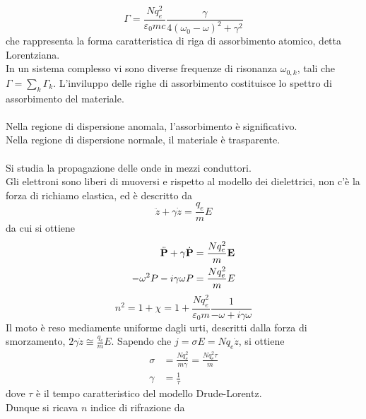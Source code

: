 \documentclass{article}
\begin{document}
\begin{equation}
    \Gamma=\frac{Nq_e^2}{\varepsilon_0mc}\frac{\gamma}{4(\omega_0-\omega)^2+\gamma^2}
    \nonumber
\end{equation}
che rappresenta la forma caratteristica di riga di assorbimento atomico, detta Lorentziana.\\
In un sistema complesso vi sono diverse frequenze di risonanza $\omega_{0,k}$, tali che $\Gamma=\sum_k\Gamma_k$. L’inviluppo delle righe di assorbimento costituisce lo spettro di assorbimento del materiale.\\
\\
Nella regione di dispersione anomala, l’assorbimento è significativo.\\
Nella regione di dispersione normale, il materiale è trasparente.\\
\\
Si studia la propagazione delle onde in mezzi conduttori.\\
Gli elettroni sono liberi di muoversi e rispetto al modello dei dielettrici, non c’è la forza di richiamo elastica, ed è descritto da
\begin{equation}
    \ddot{z}+\gamma\dot{z}=\frac{q_e}{m}E
    \nonumber
\end{equation}
da cui si ottiene
\begin{equation}
\begin{split}
    \Ddot{\textbf{P}}+\gamma\Dot{\textbf{P}}&=\frac{Nq_e^2}{m}\textbf{E}\\
    -\omega^2P-i\gamma\omega P&=\frac{Nq_e^2}{m}E
    \nonumber
\end{split}   
\end{equation}
\begin{equation}
    n^2=1+\chi=1+\frac{Nq_e^2}{\varepsilon_0m}\frac{1}{-\omega+i\gamma\omega}
    \nonumber
\end{equation}
Il moto è reso mediamente uniforme dagli urti, descritti dalla forza di smorzamento, $2\gamma\dot{z}\cong\frac{q_e}{m}E$. Sapendo che $j=\sigma E=Nq_e\dot{z}$, si ottiene
\begin{equation}
\begin{split}
     \sigma&=\frac{Nq_e^2}{m\gamma}=\frac{Nq_e^2\tau}{m}\\
     \gamma&=\frac{1}{\tau}
     \nonumber
\end{split}
\end{equation}
dove $\tau$ è il tempo caratteristico del modello Drude-Lorentz.\\
Dunque si ricava $n$ indice di rifrazione da
\end{document}
